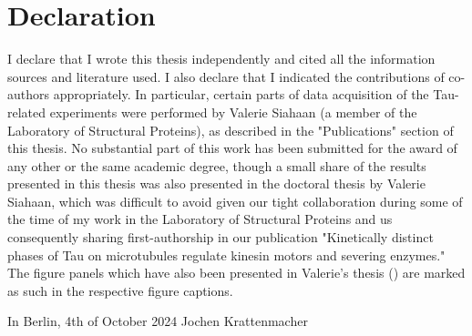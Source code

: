 \chapter*{Declaration}
I declare that I wrote this thesis independently and cited all the information sources and literature used. I also declare that I indicated the contributions of co-authors appropriately. In particular, certain parts of data acquisition of the Tau-related experiments were performed by Valerie Siahaan (a member of the Laboratory of Structural Proteins), as described in the "Publications" section of this thesis. No substantial part of this work has been submitted for the award of any other or the same academic degree, though a small share of the results presented in this thesis was also presented in the doctoral thesis by Valerie Siahaan, which was difficult to avoid given our tight collaboration during some of the time of my work in the Laboratory of Structural Proteins and us consequently sharing first-authorship in our publication "Kinetically distinct phases of Tau on microtubules regulate kinesin motors and severing enzymes." The figure panels which have also been presented in Valerie's thesis (\cite{Siahaan}) are marked as such in the respective figure captions.\\

\begin{minipage}{5in}
    \vspace{0.5in}
    In Berlin, 4th of October 2024 \hfill Jochen Krattenmacher
\end{minipage}